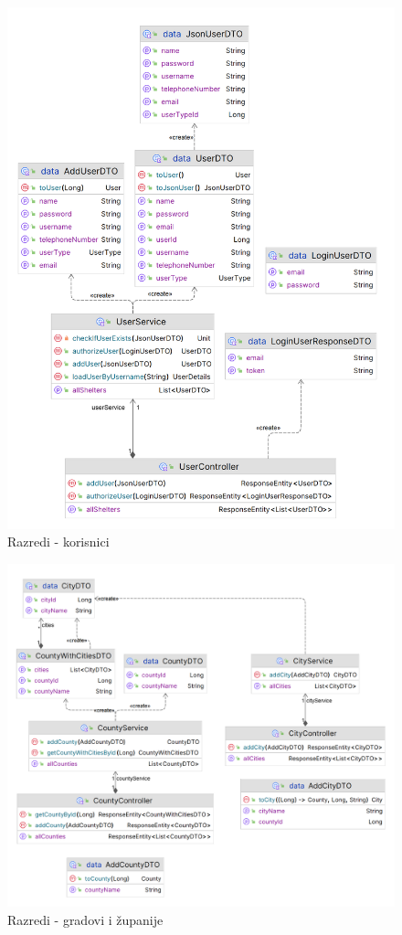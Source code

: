 			\begin{figure}[H]
				\includegraphics[scale=0.3]{slike/class_user.PNG} 
				\centering
				\caption{Razredi - korisnici}
				\label{class_user}
			\end{figure}
			
			\begin{figure}[H]
				\includegraphics[scale=0.3]{slike/class_city_county.PNG} 
				\centering
				\caption{Razredi - gradovi i županije}
				\label{class_city_county}
			\end{figure}
			
